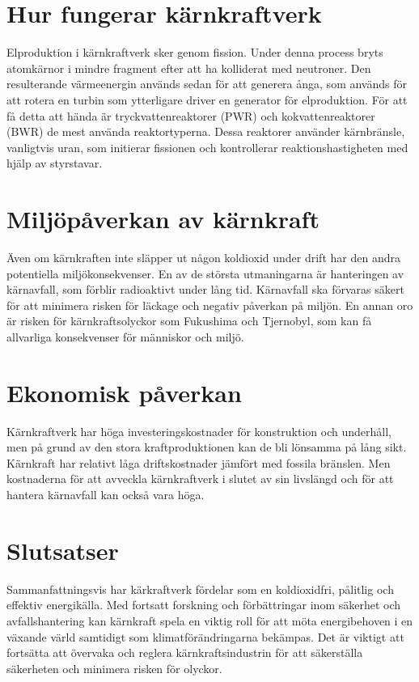 \documentclass[11p]{article}
\begin{document}
    \section{Hur fungerar kärnkraftverk}
    Elproduktion i kärnkraftverk sker genom fission. Under denna process bryts atomkärnor i mindre fragment efter att ha kolliderat med neutroner. Den resulterande värmeenergin används sedan för att generera ånga, som används för att rotera en turbin som ytterligare driver en generator för elproduktion. För att få detta att hända är tryckvattenreaktorer (PWR) och kokvattenreaktorer (BWR) de mest använda reaktortyperna. Dessa reaktorer använder kärnbränsle, vanligtvis uran, som initierar fissionen och kontrollerar reaktionshastigheten med hjälp av styrstavar.\parencite{Naturskyddsföreningen}\parencite{DukeEnergy}

    \section{Miljöpåverkan av kärnkraft}
    Även om kärnkraften inte släpper ut någon koldioxid under drift har den andra potentiella miljökonsekvenser. En av de största utmaningarna är hanteringen av kärnavfall, som förblir radioaktivt under lång tid. Kärnavfall ska förvaras säkert för att minimera risken för läckage och negativ påverkan på miljön. En annan oro är risken för kärnkraftsolyckor som Fukushima och Tjernobyl, som kan få allvarliga konsekvenser för människor och miljö.\parencite{Naturvårdsverket}

    \section{Ekonomisk påverkan}
    Kärnkraftverk har höga investeringskostnader för konstruktion och underhåll, men på grund av den stora kraftproduktionen kan de bli lönsamma på lång sikt. Kärnkraft har relativt låga driftskostnader jämfört med fossila bränslen. Men kostnaderna för att avveckla kärnkraftverk i slutet av sin livslängd och för att hantera kärnavfall kan också vara höga.\parencite{energiforsk}

    \section{Slutsatser}
    Sammanfattningsvis har kärkraftverk fördelar som en koldioxidfri, pålitlig och effektiv energikälla. Med fortsatt forskning och förbättringar inom säkerhet och avfallshantering kan kärnkraft spela en viktig roll för att möta energibehoven i en växande värld samtidigt som klimatförändringarna bekämpas. Det är viktigt att fortsätta att övervaka och reglera kärnkraftsindustrin för att säkerställa säkerheten och minimera risken för olyckor.


    \printbibliography
\end{document}
